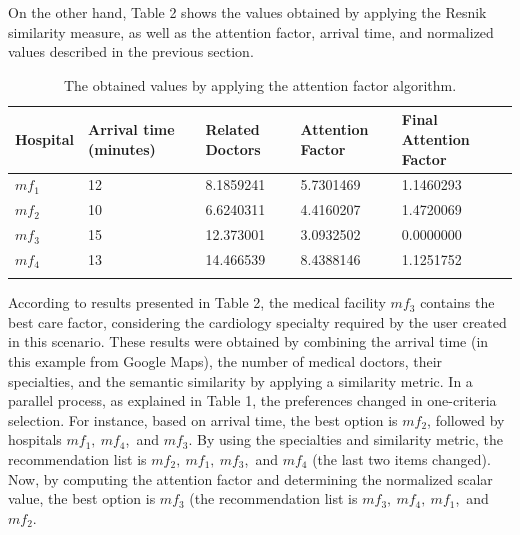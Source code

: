 \documentclass[sustainability,article,submit,pdftex,moreauthors]{Definitions/mdpi}
\begin{document}
On the other hand, Table 2 shows the values obtained by applying the Resnik similarity measure, as well as the attention factor, arrival time, and normalized values described in the previous section.


\begin{table}[H] 
\caption{The obtained values by applying the attention factor algorithm.\label{table_hospital_info}}
\begin{tabularx}{\textwidth}{CCCCC}
\toprule
\textbf{Hospital} & \textbf{Arrival time (minutes)} & \textbf{Related Doctors} & \textbf{Attention Factor} & \textbf{Final Attention Factor} \\
\midrule
$mf_{1}$ & 12 & 8.1859241 & 5.7301469 & 1.1460293 \\
$mf_{2}$ & 10 & 6.6240311 & 4.4160207 & 1.4720069 \\
$mf_{3}$ & 15 & 12.373001 & 3.0932502 & 0.0000000 \\
$mf_{4}$ & 13 & 14.466539 & 8.4388146 & 1.1251752 \\
\bottomrule \\
\end{tabularx}
\end{table}
\unskip


According to results presented in Table 2, the medical facility $mf_{3}$ contains the best care factor, considering the cardiology specialty required by the user created in this scenario. These results were obtained by combining the arrival time (in this example from Google Maps), the number of medical doctors, their specialties, and the semantic similarity by applying a similarity metric. In a parallel process, as explained in Table 1, the preferences changed in one-criteria selection. For instance, based on arrival time, the best option is $mf_2$, followed by hospitals $mf_1,\ mf_4$,\ and $mf_3$. By using the specialties and similarity metric, the recommendation list is $mf_2,\ mf_1,\ mf_3$,\ and $mf_4$ (the last two items changed). Now, by computing the attention factor and determining the normalized scalar value, the best option is $mf_3$ (the recommendation list is $mf_3,\ mf_4,\ mf_1$,\ and $mf_2$.
\end{document}

